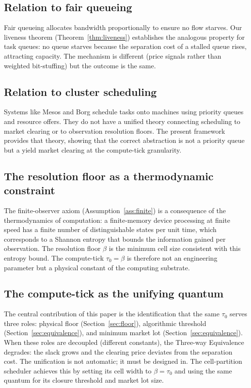 \documentclass[11pt,twocolumn,a4paper]{article}
\theoremstyle{plain}
\theoremstyle{definition}
\theoremstyle{remark}
\newcommand{\tick}{\tau_0}
\newcommand{\floor}{\beta}
\begin{document}
\subsection{Relation to fair queueing}

Fair queueing \cite{demers1990} allocates bandwidth proportionally to ensure no flow starves. Our liveness theorem (Theorem~\ref{thm:liveness}) establishes the analogous property for task queues: no queue starves because the separation cost of a stalled queue rises, attracting capacity. The mechanism is different (price signals rather than weighted bit-stuffing) but the outcome is the same.

\subsection{Relation to cluster scheduling}

Systems like Mesos \cite{hindman2011} and Borg \cite{verma2015} schedule tasks onto machines using priority queues and resource offers. They do not have a unified theory connecting scheduling to market clearing or to observation resolution floors. The present framework provides that theory, showing that the correct abstraction is not a priority queue but a yield market clearing at the compute-tick granularity.

\subsection{The resolution floor as a thermodynamic constraint}

The finite-observer axiom (Assumption~\ref{ass:finite}) is a consequence of the thermodynamics of computation: a finite-memory device processing at finite speed has a finite number of distinguishable states per unit time, which corresponds to a Shannon entropy \cite{shannon1948} that bounds the information gained per observation. The resolution floor $\floor$ is the minimum cell size consistent with this entropy bound. The compute-tick $\tick = \floor$ is therefore not an engineering parameter but a physical constant of the computing substrate.

\subsection{The compute-tick as the unifying quantum}

The central contribution of this paper is the identification that the same $\tick$ serves three roles: physical floor (Section~\ref{sec:floor}), algorithmic threshold (Section~\ref{sec:equivalence}), and minimum market lot (Section~\ref{sec:equivalence}). When these roles are decoupled (different constants), the Three-way Equivalence degrades: the slack grows and the clearing price deviates from the separation cost. The unification is not automatic; it must be designed in. The cell-partition scheduler achieves this by setting its cell width to $\floor = \tick$ and using the same quantum for its closure threshold and market lot size.
\end{document}
